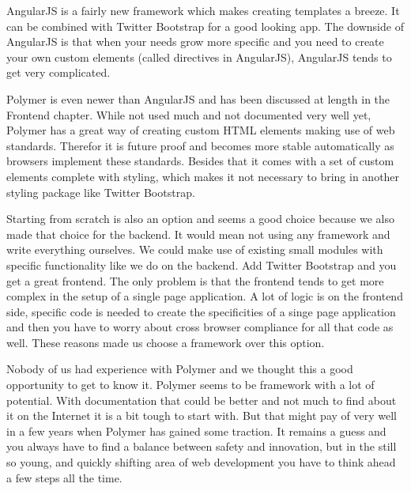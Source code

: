 AngularJS is a fairly new framework which makes creating templates a breeze.
It can be combined with Twitter Bootstrap for a good looking app.
The downside of AngularJS is that when your needs grow more specific
and you need to create your own custom elements
(called directives in AngularJS),
AngularJS tends to get very complicated.

Polymer is even newer than AngularJS
and has been discussed at length in the Frontend chapter.
While not used much and not documented very well yet,
Polymer has a great way of creating custom HTML elements
making use of web standards.
Therefor it is future proof
and becomes more stable automatically as browsers implement these standards.
Besides that it comes with a set of custom elements
complete with styling,
which makes it not necessary to bring in another styling package
like Twitter Bootstrap.

Starting from scratch is also an option
and seems a good choice because we also made that choice for the backend.
It would mean not using any framework and write everything ourselves.
We could make use of existing small modules with specific functionality
like we do on the backend.
Add Twitter Bootstrap and you get a great frontend.
The only problem is that the frontend tends to get more complex
in the setup of a single page application.
A lot of logic is on the frontend side,
specific code is needed to create the specificities of a singe page application
and then you have to worry about cross browser compliance
for all that code as well.
These reasons made us choose a framework over this option.

Nobody of us had experience with Polymer
and we thought this a good opportunity to get to know it.
Polymer seems to be framework with a lot of potential.
With documentation that could be better
and not much to find about it on the Internet
it is a bit tough to start with.
But that might pay of very well in a few years
when Polymer has gained some traction.
It remains a guess and you always have to find a balance
between safety and innovation,
but in the still so young, and quickly shifting area of web development
you have to think ahead a few steps all the time.

